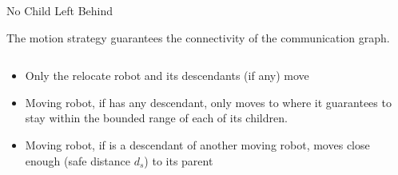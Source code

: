 \begin{frame}{No Child Left Behind}
  \begin{theorem}
   The motion strategy guarantees the connectivity of the communication graph.
  \end{theorem}
  \begin{columns}[T] %
    \begin{column}{.45\textwidth}
      \begin{itemize}
      \item Only the relocate robot and its descendants (if any) move
      \item Moving robot, if has any descendant, only moves to where it guarantees to stay within the bounded range of each of its children.
      \item Moving robot, if is a descendant of another moving robot, moves close enough (safe distance $d_s$) to its parent 
      \end{itemize}
    \end{column}%
    \begin{column}{.45\textwidth}
      \only<1>{
        
      }
    \end{column}%
  \end{columns}
\end{frame}